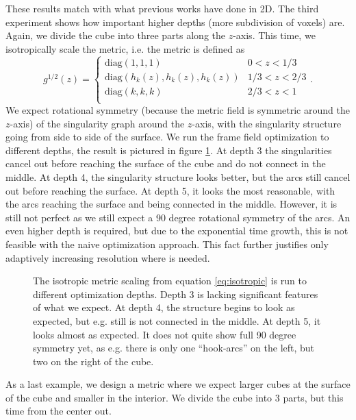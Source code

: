 \documentclass[../thesis.tex]{subfiles}
\begin{document}
These results match with what previous works have done in 2D.
The third experiment shows how important higher depths (more subdivision of voxels) are.
Again, we divide the cube into three parts along the $z$-axis.
This time, we isotropically scale the metric, i.e. the metric is defined as
\begin{equation}
g^{1/2}(z) = \begin{cases}
    \mathrm{diag}(1,1,1) &0 < z < 1/3 \\
    \mathrm{diag}(h_k(z), h_k(z), h_k(z)) &1/3 < z < 2/3 \\
    \mathrm{diag}(k,k,k) &2/3 < z < 1 \\
\end{cases}.\end{equation}\label{eq:isotropic} 
We expect rotational symmetry (because the metric field is symmetric around the $z$-axis) of the singularity graph around the $z$-axis,
with the singularity structure going from side to side of the surface. We run the frame field optimization to different
depths, the result is pictured in figure \ref{fig:isotropic}. At depth 3 the singularities
cancel out before reaching the surface of the cube and do not connect in the middle. At depth 4, the singularity structure
looks better, but the arcs still cancel out before reaching the surface. At depth 5, it looks
the most reasonable, with the arcs reaching the surface and being connected in the middle.
However, it is still not perfect as we still expect a 90 degree rotational symmetry of the arcs.
An even higher depth is required, but due to the exponential time growth, this is not feasible
with the naive optimization approach. This fact further justifies only adaptively increasing resolution where is needed.
\begin{figure}[htb]
    \centering
    \def\svgwidth{\textwidth}
    
    \caption{The isotropic metric scaling from equation \ref{eq:isotropic} is run to different optimization depths.
    Depth 3 is lacking significant features of what we expect. At depth 4, the structure begins to look as expected, but e.g. still is not connected in the middle.
    At depth 5, it looks almost as expected. It does not quite show full 90 degree symmetry yet, as e.g. there is only one ``hook-arcs'' on the left, but two on the right of the cube.}
    \label{fig:isotropic}
\end{figure}
As a last example, we design a metric where we expect larger cubes at the surface of the cube and smaller in the interior.
We divide the cube into 3 parts, but this time from the center out.
\end{document}
